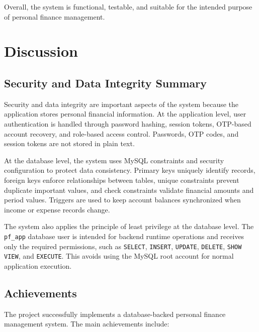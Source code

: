 \documentclass{article}
\begin{document}
Overall, the system is functional, testable, and suitable for the intended purpose of personal finance management.

\section{Discussion}
\label{sec:discussion}

\subsection{Security and Data Integrity Summary}

Security and data integrity are important aspects of the system because the application stores personal financial information. At the application level, user authentication is handled through password hashing, session tokens, OTP-based account recovery, and role-based access control. Passwords, OTP codes, and session tokens are not stored in plain text.

At the database level, the system uses MySQL constraints and security configuration to protect data consistency. Primary keys uniquely identify records, foreign keys enforce relationships between tables, unique constraints prevent duplicate important values, and check constraints validate financial amounts and period values. Triggers are used to keep account balances synchronized when income or expense records change.

The system also applies the principle of least privilege at the database level. The \texttt{pf\_app} database user is intended for backend runtime operations and receives only the required permissions, such as \texttt{SELECT}, \texttt{INSERT}, \texttt{UPDATE}, \texttt{DELETE}, \texttt{SHOW VIEW}, and \texttt{EXECUTE}. This avoids using the MySQL root account for normal application execution.

\subsection{Achievements}

The project successfully implements a database-backed personal finance management system. The main achievements include:
\end{document}
